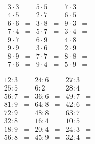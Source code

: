 \documentclass[fontsize=14pt, a4paper]{scrarticle}
\begin{document}
\begin{align*}
3\cdot3 &=& 5\cdot5 &=& 7\cdot3 &=\\
4\cdot5 &=& 2\cdot7 &=& 6\cdot5 &=\\
6\cdot6 &=& 3\cdot8 &=& 9\cdot3 &=\\
7\cdot4 &=& 5\cdot7 &=& 3\cdot4 &=\\
9\cdot7 &=& 6\cdot9 &=& 4\cdot8 &=\\
9\cdot9 &=& 3\cdot6 &=& 2\cdot9 &=\\
8\cdot9 &=& 7\cdot7 &=& 8\cdot8 &=\\
7\cdot6 &=& 9\cdot4 &=& 5\cdot9 &=
\end{align*}

\begin{align*}
    12:3 &=& 24:6 &=& 27:3 &=\\
    25:5 &=& 6:2  &=& 28:4 &=\\
    56:7 &=& 36:6 &=& 49:7 &=\\
    81:9 &=& 64:8 &=& 42:6 &=\\
    72:9 &=& 48:8 &=& 63:7 &=\\
    32:8 &=& 16:4 &=& 10:5 &=\\
    18:9 &=& 20:4 &=& 24:3 &=\\
    56:8 &=& 45:9 &=& 32:4 &=
\end{align*}
\end{document}
